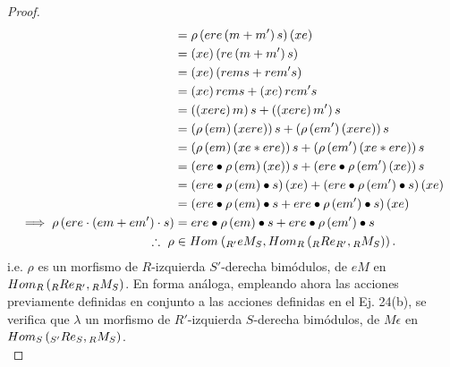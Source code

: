 \documentclass{article}
\begin{document}
\begin{enumerate}[label=\textbf{Ej \arabic*.}]
\begin{proof}
\begin{align*}
				&=\rho\lrprth{ere\lrprth{m+m'}s}(xe)\\
				&=\lrprth{xe}\lrprth{re\lrprth{m+m'}s}\\
				&=\lrprth{xe}\lrprth{rems+rem's}\\
				&=\lrprth{xe}{rems}+\lrprth{xe}{rem's}\\
				&=\lrprth{\lrprth{xere}m}s+\lrprth{\lrprth{xere}m'}s\\
				&=\lrprth{\rho\lrprth{em}\lrprth{xere}}s+\lrprth{\rho\lrprth{em'}\lrprth{xere}}s\\
				&=\lrprth{\rho\lrprth{em}\lrprth{xe*ere}}s+\lrprth{\rho\lrprth{em'}\lrprth{xe*ere}}s\\
				&=\lrprth{ere\bullet\rho\lrprth{em}\lrprth{xe}}s+\lrprth{ere\bullet\rho\lrprth{em'}\lrprth{xe}}s\\
				&=\lrprth{ere\bullet\rho\lrprth{em}\bullet s}\lrprth{xe}+\lrprth{ere\bullet\rho\lrprth{em'}\bullet s}\lrprth{xe}\\
				&=\lrprth{ere\bullet\rho\lrprth{em}\bullet s+ere\bullet\rho\lrprth{em'}\bullet s}\lrprth{xe}\\
				\implies \rho\lrprth{{ere}\cdot\lrprth{em+em'}\cdot s}&=ere\bullet\rho\lrprth{em}\bullet s+ere\bullet\rho\lrprth{em'}\bullet s\\
				\therefore\  \rho&\in\ringmodhom{}{\ringbimod{R'}{S}{eM}{lr}}{\ringmodhom{R}{\ringbimod{R}{R'}{Re}{lr}}{\ringbimod{R}{S}{M}{lr}}}.
			\end{align*}
			i.e. $\rho$ es un morfismo de $R$-izquierda $S'$-derecha bimódulos, de $eM$ en $\ringmodhom{R}{\ringbimod{R}{R'}{Re}{lr}}{\ringbimod{R}{S}{M}{lr}}$. En forma análoga, empleando ahora las acciones previamente definidas en conjunto a las acciones definidas en el Ej. 24(b), se verifica que $\lambda$ un morfismo de $R'$-izquierda $S$-derecha bimódulos, de $M\epsilon$ en $\ringmodhom{S}{\ringbimod{S'}{S }{Re}{lr}}{\ringbimod{R}{S}{M}{lr}}$.\\
		\end{proof}
		

\end{enumerate}
\end{document}
